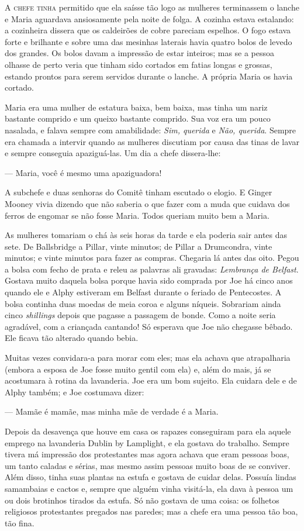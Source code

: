 \textsc{A chefe tinha} permitido que ela saísse tão logo as mulheres
terminassem o lanche e Maria aguardava ansiosamente pela noite de folga.  A
cozinha estava estalando: a cozinheira dissera que os caldeirões de cobre
pareciam espelhos.  O fogo estava forte e brilhante e sobre uma das mesinhas
laterais havia quatro bolos de levedo dos grandes.  Os bolos davam a impressão
de estar inteiros; mas se a pessoa olhasse de perto veria que tinham sido
cortados em fatias longas e grossas, estando prontos para serem servidos
durante o lanche.  A própria Maria os havia cortado.

Maria era uma mulher de estatura baixa, bem baixa, mas tinha um nariz bastante
comprido e um queixo bastante comprido.  Sua voz era um pouco nasalada, e
falava sempre com amabilidade: \textit{Sim, querida} e \textit{Não, querida}.
Sempre era chamada a intervir quando as mulheres discutiam por causa das tinas
de lavar e sempre conseguia apaziguá-las.  Um dia a chefe dissera-lhe:

--- Maria, você é mesmo uma apaziguadora!

A subchefe e duas senhoras do Comitê tinham escutado o elogio.  E Ginger Mooney
vivia dizendo que não saberia o que fazer com a muda que cuidava dos ferros de
engomar se não fosse Maria.  Todos queriam muito bem a Maria.

As mulheres tomariam o chá às seis horas da tarde e ela poderia sair antes das
sete.  De Ballsbridge a Pillar, vinte minutos; de Pillar a Drumcondra, vinte
minutos; e vinte minutos para fazer as compras.  Chegaria lá antes das oito.
Pegou a bolsa com fecho de prata e releu as palavras ali gravadas:
\textit{Lembrança de Belfast}.  Gostava muito daquela bolsa porque havia sido
comprada por Joe há cinco anos quando ele e Alphy estiveram em Belfast durante
o feriado de Pentecostes.  A bolsa continha duas moedas de meia coroa e alguns
níqueis.  Sobrariam ainda cinco \textit{shillings} depois que pagasse a
passagem de bonde.  Como a noite seria agradável, com a criançada cantando!  Só
esperava que Joe não chegasse bêbado.  Ele ficava tão alterado quando bebia.

Muitas vezes convidara-a para morar com eles; mas ela achava que atrapalharia
(embora a esposa de Joe fosse muito gentil com ela) e, além do mais, já se
acostumara à rotina da lavanderia.  Joe era um bom sujeito.  Ela cuidara dele e
de Alphy também; e Joe costumava dizer:

--- Mamãe é mamãe, mas minha mãe de verdade é a Maria.

Depois da desavença que houve em casa os rapazes conseguiram para ela aquele
emprego na lavanderia Dublin by Lamplight, e ela gostava do trabalho.  Sempre
tivera má impressão dos protestantes mas agora achava que eram pessoas boas, um
tanto caladas e sérias, mas mesmo assim pessoas muito boas de se conviver.
Além disso, tinha suas plantas na estufa e gostava de cuidar delas.  Possuía
lindas samambaias e cactos e, sempre que alguém vinha visitá-la, ela dava à
pessoa um ou dois brotinhos tirados da estufa.  Só não gostava de uma coisa: os
folhetos religiosos protestantes pregados nas paredes; mas a chefe era uma
pessoa tão boa, tão fina.

